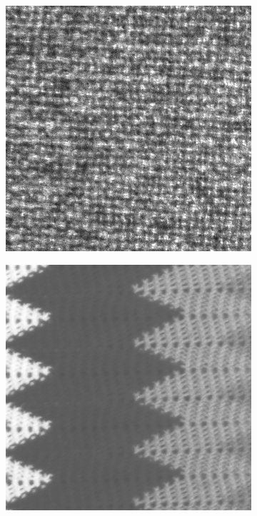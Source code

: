 \begin{figure}[H]
\begin{subfigure}{.15\textwidth}
  \centering
  \includegraphics[width=.8\linewidth]{kylberg_examples/blanket1_001.png}
\end{subfigure}%
\begin{subfigure}{.15\textwidth}
  \centering
  \includegraphics[width=.8\linewidth]{kylberg_examples/blanket2_001.png}
\end{subfigure}
\begin{subfigure}{.15\textwidth}

\end{subfigure}
\end{figure}
